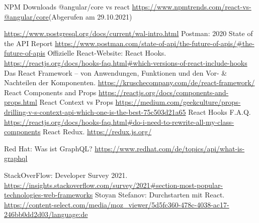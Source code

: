 \begin{thebibliography}{HR08}
 NPM Downloads @angular/core vs react \url{https://www.npmtrends.com/react-vs-@angular/core}(Abgerufen am 29.10.2021)

 \url{https://www.postgresql.org/docs/current/wal-intro.html}
Postman: 2020 State of the API Report \url{https://www.postman.com/state-of-api/the-future-of-apis/#the-future-of-apis}
 Offizielle React-Website: React Hooks. \url{https://reactjs.org/docs/hooks-faq.html#which-versions-of-react-include-hooks}
 Das React Framework – von Anwendungen, Funktionen und den Vor- \& Nachteilen der Komponenten. \url{https://kruschecompany.com/de/react-framework/}
 React Components and Props \url{https://reactjs.org/docs/components-and-props.html}
 React Context vs Props \url{https://medium.com/geekculture/props-drilling-v-s-context-api-which-one-is-the-best-75c503d21a65}
 React Hooks F.A.Q. \url{https://reactjs.org/docs/hooks-faq.html#do-i-need-to-rewrite-all-my-class-components}
 React Redux. \url{https://redux.js.org/}


Red Hat: Was ist GraphQL? \url{https://www.redhat.com/de/topics/api/what-is-graphql}

StackOverFlow: Developer Survey 2021. \url{https://insights.stackoverflow.com/survey/2021#section-most-popular-technologies-web-frameworks}
Stoyan Stefanov: Durchstarten mit React. \url{https://content-select.com/media/moz_viewer/5d5fc360-478c-4038-ac17-246bb0dd2d03/language:de}
\end{thebibliography}
